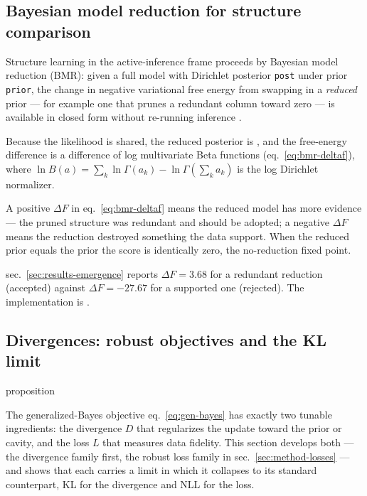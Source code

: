 \documentclass[
  english,
]{article}
\theoremstyle{plain}
\theoremstyle{definition}
\theoremstyle{remark}
\theoremstyle{definition}
\begin{document}
\subsection{Bayesian model reduction for structure
comparison}\label{sec:method-bmr}

Structure learning in the active-inference frame proceeds by Bayesian
model reduction (BMR): given a full model with Dirichlet posterior
\texttt{post} under prior \texttt{prior}, the change in negative
variational free energy from swapping in a \emph{reduced} prior --- for
example one that prunes a redundant column toward zero --- is available
in closed form without re-running inference
\citep{friston2011post, smith2020active}.

Because the likelihood is shared, the reduced posterior is
, and the free-energy
difference is a difference of log multivariate Beta functions
(eq.~\ref{eq:bmr-deltaf}), where
\(\ln B(a) = \sum_k \ln\Gamma(a_k) - \ln\Gamma(\sum_k a_k)\) is the log
Dirichlet normalizer.

A positive \(\Delta F\) in eq.~\ref{eq:bmr-deltaf} means the reduced
model has more evidence --- the pruned structure was redundant and
should be adopted; a negative \(\Delta F\) means the reduction destroyed
something the data support. When the reduced prior equals the prior the
score is identically zero, the no-reduction fixed point.

sec.~\ref{sec:results-emergence} reports \(\Delta F = 3.68\) for a
redundant reduction (accepted) against \(\Delta F = -27.67\) for a
supported one (rejected). The implementation is
.

\subsection{Divergences: robust objectives and the KL
limit}\label{sec:method-divergences}

\ifcsname proposition\endcsname
\else
\newtheorem{proposition}{Proposition}
\fi

The generalized-Bayes objective eq.~\ref{eq:gen-bayes} has exactly two
tunable ingredients: the divergence \(D\) that regularizes the update
toward the prior or cavity, and the loss \(L\) that measures data
fidelity. This section develops both --- the divergence family first,
the robust loss family in sec.~\ref{sec:method-losses} --- and shows
that each carries a limit in which it collapses to its standard
counterpart, KL for the divergence and NLL for the loss.
\end{document}
